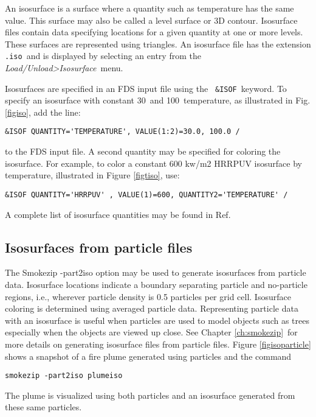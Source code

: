 \documentclass[11pt,twoside]{book}
\begin{document}
An isosurface is a surface where a quantity such as temperature has the same
value. This surface may also be called a
level surface or 3D contour. Isosurface files contain data
specifying locations for a given quantity at one or
more levels. These surfaces are represented using triangles.
An isosurface file has the extension {\tt .iso}\ and is
displayed by selecting an entry from the {\em Load/Unload>Isosurface}\ menu.

Isosurfaces are specified in an FDS input file using the {\tt
\&ISOF}\ keyword.  To specify an isosurface with constant 
30\degC\ and 100\degC\ temperature, as illustrated in Fig. \ref{figiso}, add
the line:
\begin{lstlisting}
&ISOF QUANTITY='TEMPERATURE', VALUE(1:2)=30.0, 100.0 /
\end{lstlisting}
to the FDS input file.
A second quantity may be specified for coloring the isosurface.
For example, to color a constant 600 kw/m2 HRRPUV isosurface by temperature,
illustrated in Figure \ref{figtiso},
use:
\begin{lstlisting}
&ISOF QUANTITY='HRRPUV' , VALUE(1)=600, QUANTITY2='TEMPERATURE' /
\end{lstlisting}
A complete list of isosurface quantities
may be found in Ref.~\cite{FDS_Users_Guide}

\subsection{Isosurfaces from particle files}
The Smokezip -part2iso option may be used to generate isosurfaces from particle data.
Isosurface locations indicate a boundary separating particle and
no-particle regions, i.e., wherever particle density is 0.5
particles per grid cell.  Isosurface  coloring is determined using
averaged particle data.  Representing particle data with an
isosurface is useful when particles are used to model objects such
as trees especially when the objects are viewed up close.  See
Chapter \ref{ch:smokezip}\ for more details on generating
isosurface files from particle files.  Figure \ref{figisoparticle}
shows a snapshot of a fire plume generated using particles and the command
\begin{lstlisting}
smokezip -part2iso plumeiso
\end{lstlisting}
The plume is visualized using both particles and an isosurface
generated from these same particles.
\end{document}
